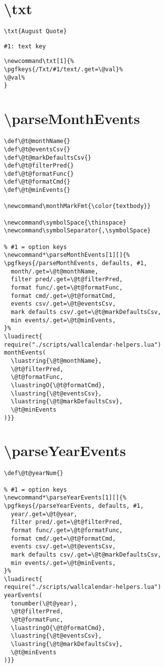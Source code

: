 \documentclass[11pt,oneside]{memoir-article}
\begin{document}
\section{\textbackslash txt}
\label{sec-9-7}

\begin{verbatim}
\txt{August Quote}
\end{verbatim}

\begin{verbatim}
#1: text key
\end{verbatim}

\begin{verbatim}
\newcommand\txt[1]{%
\pgfkeys{/Txt/#1/text/.get=\@val}%
\@val%
}
\end{verbatim}

\section{\textbackslash parseMonthEvents}
\label{sec-9-8}

\begin{verbatim}
\def\@t@monthName{}
\def\@t@eventsCsv{}
\def\@t@markDefaultsCsv{}
\def\@t@filterPred{}
\def\@t@formatFunc{}
\def\@t@formatCmd{}
\def\@t@minEvents{}

\newcommand\monthMarkFmt{\color{textbody}}

\newcommand\symbolSpace{\thinspace}
\newcommand\symbolSeparator{,\symbolSpace}

% #1 = option keys
\newcommand*\parseMonthEvents[1][]{%
\pgfkeys{/parseMonthEvents, defaults, #1,
  month/.get=\@t@monthName,
  filter pred/.get=\@t@filterPred,
  format func/.get=\@t@formatFunc,
  format cmd/.get=\@t@formatCmd,
  events csv/.get=\@t@eventsCsv,
  mark defaults csv/.get=\@t@markDefaultsCsv,
  min events/.get=\@t@minEvents,
}%
\luadirect{
require("./scripts/wallcalendar-helpers.lua")
monthEvents(
  \luastring{\@t@monthName},
  \@t@filterPred,
  \@t@formatFunc,
  \luastringO{\@t@formatCmd},
  \luastring{\@t@eventsCsv},
  \luastring{\@t@markDefaultsCsv},
  \@t@minEvents
)}}
\end{verbatim}

\section{\textbackslash parseYearEvents}
\label{sec-9-9}

\begin{verbatim}
\def\@t@yearNum{}

% #1 = option keys
\newcommand*\parseYearEvents[1][]{%
\pgfkeys{/parseYearEvents, defaults, #1,
  year/.get=\@t@year,
  filter pred/.get=\@t@filterPred,
  format func/.get=\@t@formatFunc,
  format cmd/.get=\@t@formatCmd,
  events csv/.get=\@t@eventsCsv,
  mark defaults csv/.get=\@t@markDefaultsCsv,
  min events/.get=\@t@minEvents,
}%
\luadirect{
require("./scripts/wallcalendar-helpers.lua")
yearEvents(
  tonumber(\@t@year),
  \@t@filterPred,
  \@t@formatFunc,
  \luastringO{\@t@formatCmd},
  \luastring{\@t@eventsCsv},
  \luastring{\@t@markDefaultsCsv},
  \@t@minEvents
)}}
\end{verbatim}
\end{document}

